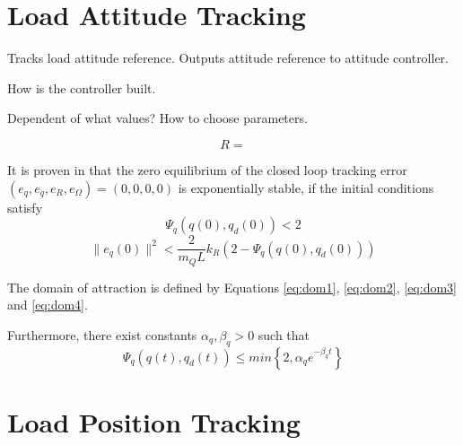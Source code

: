 \section{Load Attitude Tracking}

Tracks load attitude reference. Outputs attitude reference to attitude controller.
	
How is the controller built.

Dependent of what values? 	How to choose parameters.

\begin{figure}[h!]
	\centering
	\caption{\label{fig:con.loadattloop}}
\end{figure}		

\begin{equation}\label{eq:con.R}
R = 
\end{equation}


It is proven in \cite{Sreenath2013c} that the zero equilibrium of the closed loop tracking error $ (e_q,e_{\dot{q}},e_R,e_\Omega)=(0,0,0,0) $ is exponentially stable, if the initial conditions satisfy
\begin{equation}\label{eq:dom3}
\Psi_q(q(0),q_d(0))<2
\end{equation}
\begin{equation}\label{eq:dom4}
\parallel e_{\dot{q}}(0)\parallel^2<\frac{2}{m_QL}{k_R}(2-\Psi_q(q(0),q_d(0)))
\end{equation}

The domain of attraction is defined by Equations \ref{eq:dom1}, \ref{eq:dom2}, \ref{eq:dom3} and \ref{eq:dom4}.

Furthermore, there exist constants $ \alpha_q,\beta_q>0 $ such that
\begin{equation}\label{eq:con.Psiqconv}
\Psi_q(q(t),q_d(t)) \leq min\left\lbrace 2,\alpha_qe^{-\beta_qt}\right\rbrace 
\end{equation}

\section{Load Position Tracking}

